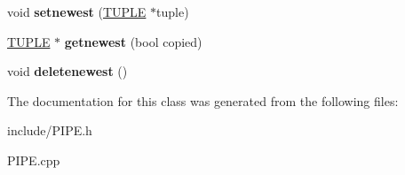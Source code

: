 \begin{DoxyCompactItemize}
\item 
\hypertarget{classPIPE_a2a9c98b1de4c40e429e7c0d3745f8995}{}void {\bfseries setnewest} (\hyperlink{classTUPLE}{T\+U\+P\+L\+E} $\ast$tuple)\label{classPIPE_a2a9c98b1de4c40e429e7c0d3745f8995}

\item 
\hypertarget{classPIPE_abc831e1e81ea1355c98e0fad399ed601}{}\hyperlink{classTUPLE}{T\+U\+P\+L\+E} $\ast$ {\bfseries getnewest} (bool copied)\label{classPIPE_abc831e1e81ea1355c98e0fad399ed601}

\item 
\hypertarget{classPIPE_a25ace21c01a91d90883bd8467984f9d5}{}void {\bfseries deletenewest} ()\label{classPIPE_a25ace21c01a91d90883bd8467984f9d5}

\end{DoxyCompactItemize}


The documentation for this class was generated from the following files\+:\begin{DoxyCompactItemize}
\item 
include/P\+I\+P\+E.\+h\item 
P\+I\+P\+E.\+cpp\end{DoxyCompactItemize}
